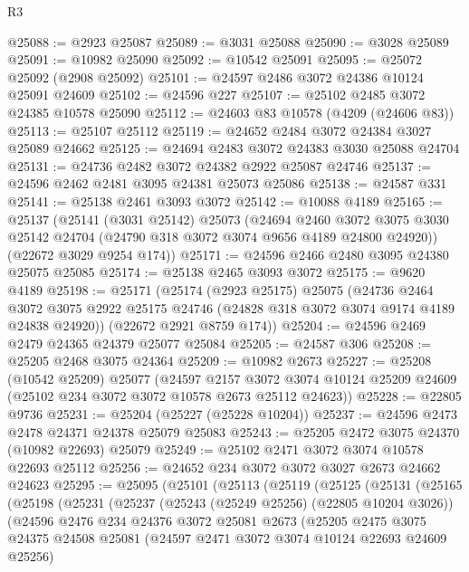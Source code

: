 \begin{lexlean}{R3}
\begin{coremodule}
@25088 := @2923 @25087
@25089 := @3031 @25088
@25090 := @3028 @25089
@25091 := @10982 @25090
@25092 := @10542 @25091
@25095 := @25072 @25092 (@2908 @25092)
@25101 := @24597 @2486 @3072 @24386 @10124 @25091 @24609
@25102 := @24596 @227
@25107 := @25102 @2485 @3072 @24385 @10578 @25090
@25112 := @24603 @83 @10578 (@4209 (@24606 @83))
@25113 := @25107 @25112
@25119 := @24652 @2484 @3072 @24384 @3027 @25089 @24662
@25125 := @24694 @2483 @3072 @24383 @3030 @25088 @24704
@25131 := @24736 @2482 @3072 @24382 @2922 @25087 @24746
@25137 := @24596 @2462 @2481 @3095 @24381 @25073 @25086
@25138 := @24587 @331
@25141 := @25138 @2461 @3093 @3072
@25142 := @10088 @4189
@25165 := @25137
    (@25141
      (@3031 @25142)
      @25073
      (@24694
        @2460
        @3072
        @3075
        @3030
        @25142
        @24704
        (@24790 @318 @3072 @3074 @9656 @4189 @24800 @24920))
      (@22672 @3029 @9254 @174))
@25171 := @24596 @2466 @2480 @3095 @24380 @25075 @25085
@25174 := @25138 @2465 @3093 @3072
@25175 := @9620 @4189
@25198 := @25171
    (@25174
      (@2923 @25175)
      @25075
      (@24736
        @2464
        @3072
        @3075
        @2922
        @25175
        @24746
        (@24828 @318 @3072 @3074 @9174 @4189 @24838 @24920))
      (@22672 @2921 @8759 @174))
@25204 := @24596 @2469 @2479 @24365 @24379 @25077 @25084
@25205 := @24587 @306
@25208 := @25205 @2468 @3075 @24364
@25209 := @10982 @2673
@25227 := @25208
    (@10542 @25209)
    @25077
    (@24597
      @2157
      @3072
      @3074
      @10124
      @25209
      @24609
      (@25102 @234 @3072 @3072 @10578 @2673 @25112 @24623))
@25228 := @22805 @9736
@25231 := @25204 (@25227 (@25228 @10204))
@25237 := @24596 @2473 @2478 @24371 @24378 @25079 @25083
@25243 := @25205 @2472 @3075 @24370 (@10982 @22693) @25079
@25249 := @25102 @2471 @3072 @3074 @10578 @22693 @25112
@25256 := @24652 @234 @3072 @3072 @3027 @2673 @24662 @24623
@25295 := @25095
    (@25101
      (@25113
        (@25119
          (@25125
            (@25131
              (@25165
                (@25198
                  (@25231
                    (@25237
                      (@25243 (@25249 @25256) (@22805 @10204 @3026))
                      (@24596
                        @2476
                        @234
                        @24376
                        @3072
                        @25081
                        @2673
                        (@25205
                          @2475
                          @3075
                          @24375
                          @24508
                          @25081
                          (@24597 @2471 @3072 @3074 @10124 @22693 @24609 @25256)

\end{coremodule}
\end{lexlean}
